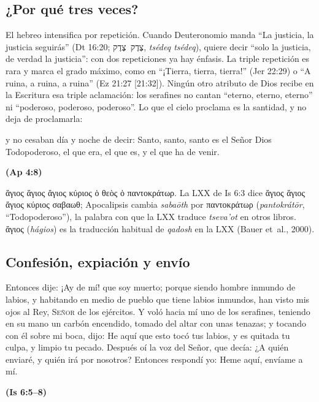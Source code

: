\documentclass[11pt,letterpaper]{article}
\newcommand{\heb}[1]{\mbox{\foreignlanguage{hebrew}{#1}}}
\newcommand{\grc}[1]{\foreignlanguage{ancientgreek}{#1}}
\newcommand{\SENOR}{\textsc{Señor}}
\newcommand{\fuente}[1]{\par\hfill{\upshape\bfseries\small\textcolor{azul}{#1}}}
\begin{document}
\subsection{¿Por qué tres veces?}
El hebreo intensifica por repetición. Cuando Deuteronomio manda ``La justicia, la justicia seguirás'' (Dt 16:20; \heb{צֶדֶק צֶדֶק}, \emph{tsédeq tsédeq}), quiere decir ``solo la justicia, de verdad la justicia'': con dos repeticiones ya hay énfasis. La triple repetición es rara y marca el grado máximo, como en ``¡Tierra, tierra, tierra!'' (Jer 22:29) o ``A ruina, a ruina, a ruina'' (Ez 21:27 [21:32]). Ningún otro atributo de Dios recibe en la Escritura esa triple aclamación: los serafines no cantan ``eterno, eterno, eterno'' ni ``poderoso, poderoso, poderoso''. Lo que el cielo proclama es la santidad, y no deja de proclamarla:

\begin{cita}y no cesaban día y noche de decir: Santo, santo, santo es el Señor Dios Todopoderoso, el que era, el que es, y el que ha de venir.\fuente{(Ap 4:8)}\end{cita}

\begin{filologia}[Ap 4:8]
\grc{ἅγιος ἅγιος ἅγιος κύριος ὁ θεὸς ὁ παντοκράτωρ}. La LXX de Is 6:3 dice \grc{ἅγιος ἅγιος ἅγιος κύριος σαβαωθ}; Apocalipsis cambia \emph{sabaōth} por \grc{παντοκράτωρ} (\emph{pantokrátōr}, ``Todopoderoso''), la palabra con que la LXX traduce \emph{tseva'ot} en otros libros. \grc{ἅγιος} (\emph{hágios}) es la traducción habitual de \emph{qadosh} en la LXX (Bauer et~al., 2000).
\end{filologia}


\subsection{Confesión, expiación y envío}
\begin{cita}Entonces dije: ¡Ay de mí! que soy muerto; porque siendo hombre inmundo de labios, y habitando en medio de pueblo que tiene labios inmundos, han visto mis ojos al Rey, \SENOR{} de los ejércitos. Y voló hacia mí uno de los serafines, teniendo en su mano un carbón encendido, tomado del altar con unas tenazas; y tocando con él sobre mi boca, dijo: He aquí que esto tocó tus labios, y es quitada tu culpa, y limpio tu pecado. Después oí la voz del Señor, que decía: ¿A quién enviaré, y quién irá por nosotros? Entonces respondí yo: Heme aquí, envíame a mí.\fuente{(Is 6:5--8)}\end{cita}
\end{document}
